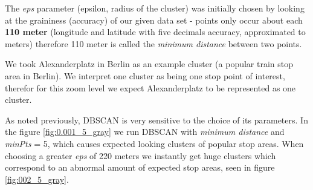 The \textit{eps} parameter (epsilon, radius of the cluster) was initially chosen by looking at the graininess (accuracy) of our given data set - points only occur about each \textbf{110 meter} (longitude and latitude with five decimals accuracy, approximated to meters) therefore 110 meter is called the \textit{minimum distance} between two points.  

We took Alexanderplatz in Berlin as an example cluster (a popular train stop area in Berlin). We interpret one cluster as being one stop point of interest, therefor for this zoom level we expect Alexanderplatz to be represented as one cluster. 

As noted previously, DBSCAN is very sensitive to the choice of its parameters. In the figure \autoref{fig:0.001_5_gray} we run DBSCAN with \textit{minimum distance}  and \textit{minPts} = 5, which causes expected looking clusters of popular stop areas. When choosing a greater \textit{eps} of 220 meters we instantly get huge clusters which correspond to an abnormal amount of expected stop areas, seen in figure \autoref{fig:002_5_gray}. 

